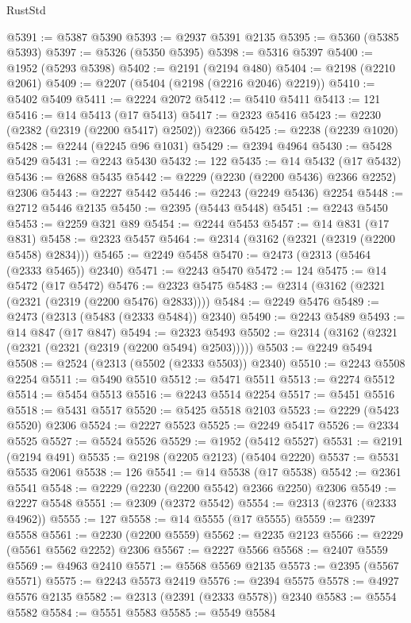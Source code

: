 \begin{lexlean}{RustStd}
\begin{coremodule}
@5391 := @5387 @5390
@5393 := @2937 @5391 @2135
@5395 := @5360 (@5385 @5393)
@5397 := @5326 (@5350 @5395)
@5398 := @5316 @5397
@5400 := @1952 (@5293 @5398)
@5402 := @2191 (@2194 @480)
@5404 := @2198 (@2210 @2061)
@5409 := @2207 (@5404 (@2198 (@2216 @2046) @2219))
@5410 := @5402 @5409
@5411 := @2224 @2072
@5412 := @5410 @5411
@5413 := 121
@5416 := @14 @5413 (@17 @5413)
@5417 := @2323 @5416
@5423 := @2230 (@2382 (@2319 (@2200 @5417) @2502)) @2366
@5425 := @2238 (@2239 @1020)
@5428 := @2244 (@2245 @96 @1031)
@5429 := @2394 @4964
@5430 := @5428 @5429
@5431 := @2243 @5430
@5432 := 122
@5435 := @14 @5432 (@17 @5432)
@5436 := @2688 @5435
@5442 := @2229 (@2230 (@2200 @5436) @2366 @2252) @2306
@5443 := @2227 @5442
@5446 := @2243 (@2249 @5436) @2254
@5448 := @2712 @5446 @2135
@5450 := @2395 (@5443 @5448)
@5451 := @2243 @5450
@5453 := @2259 @321 @89
@5454 := @2244 @5453
@5457 := @14 @831 (@17 @831)
@5458 := @2323 @5457
@5464 := @2314 (@3162 (@2321 (@2319 (@2200 @5458) @2834)))
@5465 := @2249 @5458
@5470 := @2473 (@2313 (@5464 (@2333 @5465)) @2340)
@5471 := @2243 @5470
@5472 := 124
@5475 := @14 @5472 (@17 @5472)
@5476 := @2323 @5475
@5483 := @2314 (@3162 (@2321 (@2321 (@2319 (@2200 @5476) @2833))))
@5484 := @2249 @5476
@5489 := @2473 (@2313 (@5483 (@2333 @5484)) @2340)
@5490 := @2243 @5489
@5493 := @14 @847 (@17 @847)
@5494 := @2323 @5493
@5502 := @2314 (@3162 (@2321 (@2321 (@2321 (@2319 (@2200 @5494) @2503)))))
@5503 := @2249 @5494
@5508 := @2524 (@2313 (@5502 (@2333 @5503)) @2340)
@5510 := @2243 @5508 @2254
@5511 := @5490 @5510
@5512 := @5471 @5511
@5513 := @2274 @5512
@5514 := @5454 @5513
@5516 := @2243 @5514 @2254
@5517 := @5451 @5516
@5518 := @5431 @5517
@5520 := @5425 @5518 @2103
@5523 := @2229 (@5423 @5520) @2306
@5524 := @2227 @5523
@5525 := @2249 @5417
@5526 := @2334 @5525
@5527 := @5524 @5526
@5529 := @1952 (@5412 @5527)
@5531 := @2191 (@2194 @491)
@5535 := @2198 (@2205 @2123) (@5404 @2220)
@5537 := @5531 @5535 @2061
@5538 := 126
@5541 := @14 @5538 (@17 @5538)
@5542 := @2361 @5541
@5548 := @2229 (@2230 (@2200 @5542) @2366 @2250) @2306
@5549 := @2227 @5548
@5551 := @2309 (@2372 @5542)
@5554 := @2313 (@2376 (@2333 @4962))
@5555 := 127
@5558 := @14 @5555 (@17 @5555)
@5559 := @2397 @5558
@5561 := @2230 (@2200 @5559)
@5562 := @2235 @2123
@5566 := @2229 (@5561 @5562 @2252) @2306
@5567 := @2227 @5566
@5568 := @2407 @5559
@5569 := @4963 @2410
@5571 := @5568 @5569 @2135
@5573 := @2395 (@5567 @5571)
@5575 := @2243 @5573 @2419
@5576 := @2394 @5575
@5578 := @4927 @5576 @2135
@5582 := @2313 (@2391 (@2333 @5578)) @2340
@5583 := @5554 @5582
@5584 := @5551 @5583
@5585 := @5549 @5584

\end{coremodule}
\end{lexlean}
